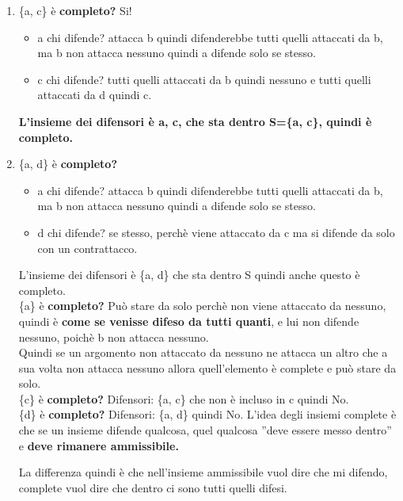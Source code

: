 \begin{enumerate}
    \item \{a, c\} è \textbf{completo?} Si!
    \begin{itemize}
        \item a chi difende? attacca b quindi difenderebbe tutti quelli attaccati da b, ma b non attacca nessuno quindi a difende solo se stesso.
        \item c chi difende? tutti quelli attaccati da b quindi nessuno e tutti quelli attaccati da d quindi c.
    \end{itemize}
\textbf{L’insieme dei difensori è a, c, che sta dentro S=\{a, c\}, quindi è completo.}
    \item \{a, d\} è \textbf{completo?}
    \begin{itemize}
        \item a chi difende? attacca b quindi difenderebbe tutti quelli attaccati da b, ma b non attacca nessuno quindi a difende solo se stesso.
        \item d chi difende? se stesso, perchè viene attaccato da c ma si difende da solo con un contrattacco.
    \end{itemize}
    L’insieme dei difensori è \{a, d\} che sta dentro S quindi anche questo è completo.
    \\\{a\} è \textbf{completo?} Può stare da solo perchè non viene attaccato da nessuno, quindi è \textbf{come se venisse difeso da tutti quanti}, e lui non difende nessuno, poichè b non attacca nessuno. 
    \\Quindi se un argomento non attaccato da nessuno ne attacca un altro che a sua volta non attacca nessuno allora quell’elemento è complete e può stare da solo.
    \\\{c\} è \textbf{completo?} Difensori: \{a, c\} che non è incluso in c quindi No.
    \\\{d\} è \textbf{completo?} Difensori: \{a, d\} quindi No. L’idea degli insiemi complete è che se un insieme difende qualcosa, quel qualcosa ”deve essere messo dentro” e \textbf{deve rimanere ammissibile.}
    
    \vspace{0.8cm}
    
    La differenza quindi è che nell’insieme ammissibile vuol dire che mi difendo, complete vuol dire che dentro ci sono tutti quelli difesi.
\end{enumerate}
\
